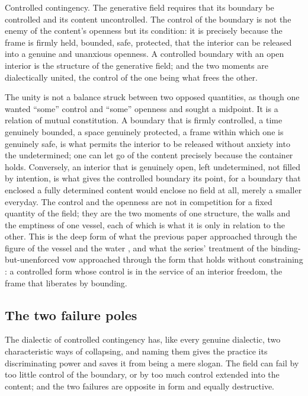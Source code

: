 \begin{thesis}{Controlled contingency.}
The generative field requires that its boundary be controlled and its content uncontrolled. The control of the boundary is not the enemy of the content's openness but its condition: it is precisely because the frame is firmly held, bounded, safe, protected, that the interior can be released into a genuine and unanxious openness. A controlled boundary with an open interior is the structure of the generative field; and the two moments are dialectically united, the control of the one being what frees the other.
\end{thesis}

\noindent
The unity is not a balance struck between two opposed quantities, as though one wanted ``some'' control and ``some'' openness and sought a midpoint. It is a relation of mutual constitution. A boundary that is firmly controlled, a time genuinely bounded, a space genuinely protected, a frame within which one is genuinely safe, is what permits the interior to be released without anxiety into the undetermined; one can let go of the content precisely because the container holds. Conversely, an interior that is genuinely open, left undetermined, not filled by intention, is what gives the controlled boundary its point, for a boundary that enclosed a fully determined content would enclose no field at all, merely a smaller everyday. The control and the openness are not in competition for a fixed quantity of the field; they are the two moments of one structure, the walls and the emptiness of one vessel, each of which is what it is only in relation to the other. This is the deep form of what the previous paper approached through the figure of the vessel and the water \parencite{paperxx}, and what the series' treatment of the binding-but-unenforced vow approached through the form that holds without constraining \parencite{paperxiii}: a controlled form whose control is in the service of an interior freedom, the frame that liberates by bounding.

\subsection{The two failure poles}
\label{p21:sub:constr-poles}

The dialectic of controlled contingency has, like every genuine dialectic, two characteristic ways of collapsing, and naming them gives the practice its discriminating power and saves it from being a mere slogan. The field can fail by too little control of the boundary, or by too much control extended into the content; and the two failures are opposite in form and equally destructive.

